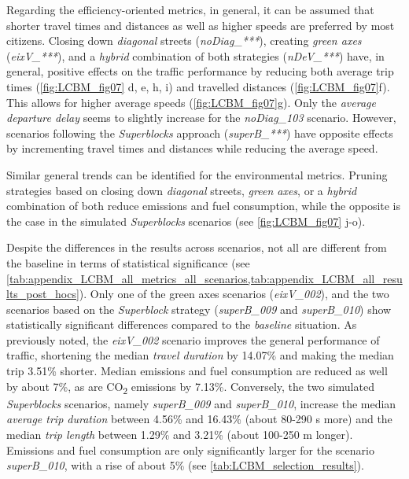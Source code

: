 Regarding the efficiency-oriented metrics, in general, it can be assumed that shorter travel times and distances as well as higher speeds are preferred by most citizens. Closing down \emph{diagonal} streets (\emph{noDiag\_***}), creating \emph{green axes} (\emph{eixV\_***}), and a \emph{hybrid} combination of both strategies (\emph{nDeV\_***}) have, in general, positive effects on the traffic performance by reducing both average trip times (\cref{fig:LCBM_fig07} d, e, h, i) and travelled distances (\cref{fig:LCBM_fig07}f). This allows for higher average speeds (\cref{fig:LCBM_fig07}g). Only the \emph{average departure delay} seems to slightly increase for the \emph{noDiag\_103} scenario. However, scenarios following the \emph{Superblocks} approach (\emph{superB\_***}) have opposite effects by incrementing travel times and distances while reducing the average speed.

Similar general trends can be identified for the environmental metrics. Pruning strategies based on closing down \emph{diagonal} streets, \emph{green axes}, or a \emph{hybrid} combination of both reduce emissions and fuel consumption, while the opposite is the case in the simulated \emph{Superblocks} scenarios (see \cref{fig:LCBM_fig07} j-o).

Despite the differences in the results across scenarios, not all are different from the baseline in terms of statistical significance (see \cref{tab:appendix_LCBM_all_metrics_all_scenarios,tab:appendix_LCBM_all_results_post_hocs}). Only one of the green axes scenarios (\emph{eixV\_002}), and the two scenarios based on the \emph{Superblock} strategy (\emph{superB\_009} and \emph{superB\_010}) show statistically significant differences compared to the \emph{baseline} situation. As previously noted, the \emph{eixV\_002} scenario improves the general performance of traffic, shortening the median \emph{travel duration} by 14.07\% and making the median trip 3.51\% shorter. Median emissions and fuel consumption are reduced as well by about 7\%, as are CO\textsubscript{2} emissions by 7.13\%. Conversely, the two simulated \emph{Superblocks} scenarios, namely \emph{superB\_009} and \emph{superB\_010}, increase the median \emph{average trip duration} between 4.56\% and 16.43\% (about 80-290 s more) and the median \emph{trip length} between 1.29\% and 3.21\% (about 100-250 m longer). Emissions and fuel consumption are only significantly larger for the scenario \emph{superB\_010}, with a rise of about 5\% (see \cref{tab:LCBM_selection_results}).


